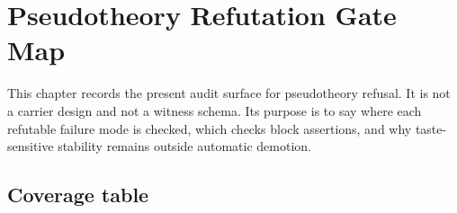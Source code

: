 \chapter{Pseudotheory Refutation Gate Map}
\label{ch:pseudotheory-refutation-gate-map}

This chapter records the present audit surface for pseudotheory refusal.  It is
not a carrier design and not a witness schema.  Its purpose is to say where
each refutable failure mode is checked, which checks block assertions, and why
taste-sensitive stability remains outside automatic demotion.

\section{Coverage table}
\label{sec:pseudotheory-refutation-coverage-table}

